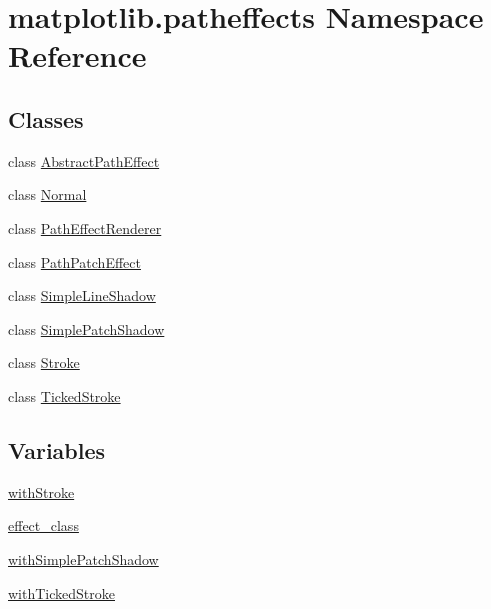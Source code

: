 \hypertarget{namespacematplotlib_1_1patheffects}{}\section{matplotlib.\+patheffects Namespace Reference}
\label{namespacematplotlib_1_1patheffects}
\subsection*{Classes}
\begin{DoxyCompactItemize}
\item 
class \hyperlink{classmatplotlib_1_1patheffects_1_1AbstractPathEffect}{Abstract\+Path\+Effect}
\item 
class \hyperlink{classmatplotlib_1_1patheffects_1_1Normal}{Normal}
\item 
class \hyperlink{classmatplotlib_1_1patheffects_1_1PathEffectRenderer}{Path\+Effect\+Renderer}
\item 
class \hyperlink{classmatplotlib_1_1patheffects_1_1PathPatchEffect}{Path\+Patch\+Effect}
\item 
class \hyperlink{classmatplotlib_1_1patheffects_1_1SimpleLineShadow}{Simple\+Line\+Shadow}
\item 
class \hyperlink{classmatplotlib_1_1patheffects_1_1SimplePatchShadow}{Simple\+Patch\+Shadow}
\item 
class \hyperlink{classmatplotlib_1_1patheffects_1_1Stroke}{Stroke}
\item 
class \hyperlink{classmatplotlib_1_1patheffects_1_1TickedStroke}{Ticked\+Stroke}
\end{DoxyCompactItemize}
\subsection*{Variables}
\begin{DoxyCompactItemize}
\item 
\hyperlink{namespacematplotlib_1_1patheffects_a072b2e6be84875cfd6fb000199c7d971}{with\+Stroke}
\item 
\hyperlink{namespacematplotlib_1_1patheffects_adfbf7a0896f2d631523e28aae01b695f}{effect\+\_\+class}
\item 
\hyperlink{namespacematplotlib_1_1patheffects_a4b345c04e706cef5ef935d6a77184534}{with\+Simple\+Patch\+Shadow}
\item 
\hyperlink{namespacematplotlib_1_1patheffects_a67eadf1e90e6ded380902e690e3a4d1d}{with\+Ticked\+Stroke}
\end{DoxyCompactItemize}



